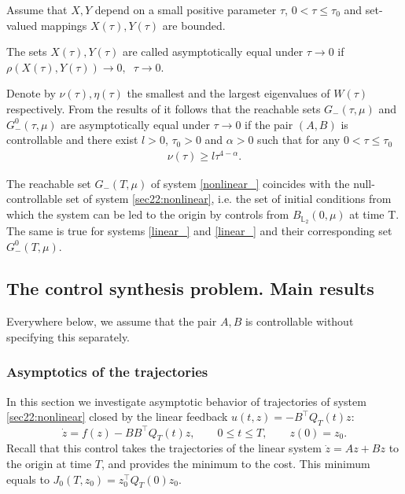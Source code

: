 \documentclass[../main.tex]{subfiles}
\begin{document}
Assume that  $X,Y$ depend on a small positive parameter $\tau$,  $0<\tau\leqslant\tau_0$  and set-valued mappings  $X(\tau), Y(\tau)$ are bounded. 
\begin{definition}	
 The sets $ X (\tau), Y (\tau) $ are called asymptotically equal under $\tau \to 0$ if $ \rho (X (\tau), Y (\tau)) \to 0,\;\; \tau \to 0$.
\end{definition}
Denote by $\nu(\tau), \eta(\tau)$  the smallest and the largest eigenvalues of $W(\tau)$ respectively. From  the results of  \cite{Polyak2001,GusOsSteklov,Osipov,GusevMotor} it follows that the reachable sets 
$G_{-}(\tau,\mu)$ and $G_{-}^0(\tau,\mu)$ are asymptotically equal under $\tau \to 0$ if the pair $(A,B)$ is controllable and
there exist $ l > 0$, $\tau_0 > 0$ and $\alpha > 0$ such that for any $0 < \tau \leqslant \tau_0 $
		\begin{gather}\label{gramas}
			\nu(\tau)\geqslant l\tau^{4-\alpha}.
		\end{gather}

\begin{zam}
    The reachable set $G_{-}(T,\mu)$ of system \eqref{nonlinear_} coincides with the null-controllable set of system \eqref{sec22:nonlinear}, i.e. the set of initial conditions from which the system can be led to the origin by controls from $B_{\mathbb{L}_2}(0,\mu) $ at time T. The same is true for systems \eqref{linear_} and \eqref{linear_} and their corresponding set $G_{-}^0(T,\mu)$.
\end{zam}

\subsection{The control synthesis problem. Main results}
Everywhere below, we assume that the pair $A,B$ is controllable without specifying this separately.
\subsubsection{Asymptotics of the trajectories}

In this section we  investigate asymptotic behavior of trajectories  of system \eqref{sec22:nonlinear} closed by the linear feedback $ u(t,z) = -B^{\top} Q_T(t) z$:
\begin{equation}\label{nonlinear_closed}
	\dot{z} = f(z) - B B^{\top} Q_T(t) z, \qquad 0 \leqslant t \leqslant T, \qquad z(0) = z_0.
\end{equation}
Recall that this control takes the trajectories of the  linear system $\dot{z} = A z + B z$   to the origin at time $T$, and provides the minimum to the cost. This minimum   equals to  $J_0(T,z_0) =z_0^{\top}Q_T(0)z_0$.
\end{document}
